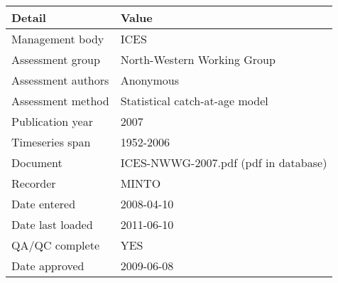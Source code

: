 \begin{table}[htb]
\centering
\begin{tabular}{lp{7cm}}
\toprule
Detail & Value \\
\midrule
Management body    & ICES                                 \\
Assessment group   & North-Western Working Group          \\
Assessment authors & Anonymous                            \\
Assessment method  & Statistical catch-at-age model       \\
Publication year   & 2007                                 \\
Timeseries span    & 1952-2006                            \\
Document           & ICES-NWWG-2007.pdf (pdf in database) \\
Recorder           & MINTO                                \\
Date entered       & 2008-04-10                           \\
Date last loaded   & 2011-06-10                           \\
QA/QC complete     & YES                                  \\
Date approved      & 2009-06-08                           \\
\bottomrule
\end{tabular}
\label{tab:assessdet}
\end{table}
